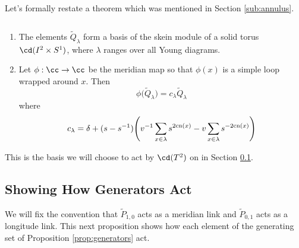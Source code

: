 Let's formally restate a theorem which was mentioned in Section \ref{sub:annulus}.

\begin{theorem}\label{thm:ann_basis} 
$\,$
\begin{enumerate}
    \item The elements $\tilde{Q}_\lambda$ form a basis of the skein module of a solid torus $\cd(I^2 \times S^1)$, where $\lambda$ ranges over all Young diagrams. 
    \item Let $\phi: \cc \to \cc$ be the meridian map so that $\phi(x)$ is a simple loop wrapped around $x$. Then
    \[
        \phi \big( \tilde{Q}_\lambda \big) = c_\lambda \tilde{Q}_\lambda
    \]
    where 
        \[c_\lambda = \delta + (s - s^{-1}) \Bigg( v^{-1}\sum_{x \in \lambda} s^{2\mathrm{cn}(x)} - v\sum_{x \in \lambda} s^{-2\mathrm{cn}(x)} \Bigg)
    \]
\end{enumerate}
\end{theorem}

This is the basis we will choose to act by $\cd(T^2)$ on in Section \ref{sec:action}. 


\subsection{Showing How Generators Act} \label{sec:action}

We will fix the convention that $\tilde{P}_{1,0}$ acts as a meridian link and $\tilde{P}_{0,1}$ acts as a longitude link. This next proposition shows how each element of the generating set of Proposition \ref{prop:generators} act.

